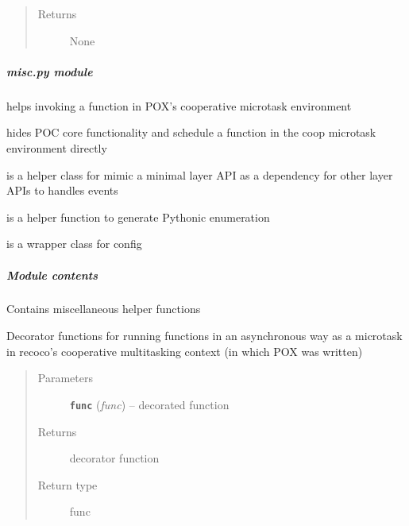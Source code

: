 \documentclass[letterpaper,10pt,english]{sphinxmanual}
\begin{document}
\begin{fulllineitems}
\begin{fulllineitems}
\begin{quote}
\begin{description}
\item[{Returns}] \leavevmode
None

\end{description}\end{quote}

\end{fulllineitems}


\end{fulllineitems}



\subparagraph{\emph{misc.py} module}
\label{util/misc:misc-py-module}\label{util/misc::doc}
{\hyperref[util/misc:escape.util.misc.schedule_as_coop_task]{\emph{}}} helps invoking a function in POX's cooperative
microtask environment

{\hyperref[util/misc:escape.util.misc.call_as_coop_task]{\emph{}}} hides POC core functionality and schedule a
function in the coop microtask environment directly

{\hyperref[util/misc:escape.util.misc.SimpleStandaloneHelper]{\emph{}}} is a helper class for mimic a minimal layer
API as a dependency for other layer APIs to handles events

{\hyperref[util/misc:escape.util.misc.enum]{\emph{}}} is a helper function to generate Pythonic enumeration

{\hyperref[util/misc:escape.util.misc.ESCAPEConfig]{\emph{}}} is a wrapper class for config


\subparagraph{Module contents}
\label{util/misc:module-contents}\label{util/misc:module-escape.util.misc}
Contains miscellaneous helper functions

\begin{fulllineitems}
\label{util/misc:escape.util.misc.schedule_as_coop_task}
Decorator functions for running functions in an asynchronous way as a
microtask in recoco's cooperative multitasking context (in which POX was
written)
\begin{quote}\begin{description}
\item[{Parameters}] \leavevmode
\textbf{\texttt{func}} (\emph{func}) -- decorated function

\item[{Returns}] \leavevmode
decorator function

\item[{Return type}] \leavevmode
func

\end{description}\end{quote}

\end{fulllineitems}
\end{document}
